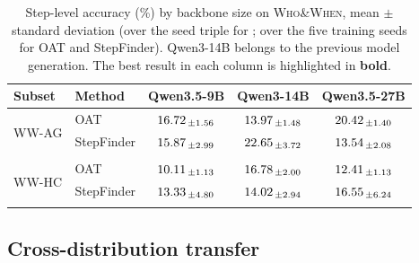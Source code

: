 \begin{table}[h]
\centering
\small
\setlength{\tabcolsep}{5pt}
\caption{Step-level accuracy (\%) by backbone size on \textsc{Who\&When}, mean $\pm$ standard
deviation (over the seed triple for \soap{}; over the five training seeds for OAT and
StepFinder). Qwen3-14B belongs to the previous model generation. The best result in
each column is highlighted in \textbf{bold}.}
\label{tab:scale}
\begin{tabular}{l l ccc}
\toprule
Subset & Method & Qwen3.5-9B & Qwen3-14B & Qwen3.5-27B \\
\midrule
\multirow{3}{*}{\textsc{WW-AG}}
 & OAT        & $16.72_{\,\pm 1.56}$ & $13.97_{\,\pm 1.48}$ & $20.42_{\,\pm 1.40}$ \\
 & StepFinder & $15.87_{\,\pm 2.99}$ & $22.65_{\,\pm 3.72}$ & $13.54_{\,\pm 2.08}$ \\
 & \cellcolor{gray!10}\soap{}    & \cellcolor{gray!10}{\boldmath$\ms{47.62}{2.59}$} & \cellcolor{gray!10}{\boldmath$\ms{42.86}{4.67}$} & \cellcolor{gray!10}{\boldmath$\ms{44.97}{2.70}$} \\
\midrule
\multirow{3}{*}{\textsc{WW-HC}}
 & OAT        & $10.11_{\,\pm 1.13}$ & $16.78_{\,\pm 2.00}$ & $12.41_{\,\pm 1.13}$ \\
 & StepFinder & $13.33_{\,\pm 4.80}$ & $14.02_{\,\pm 2.94}$ & $16.55_{\,\pm 6.24}$ \\
 & \cellcolor{gray!10}\soap{}    & \cellcolor{gray!10}{\boldmath$\ms{34.48}{2.82}$} & \cellcolor{gray!10}{\boldmath$\ms{25.29}{6.50}$} & \cellcolor{gray!10}{\boldmath$\ms{34.48}{2.82}$} \\
\bottomrule
\end{tabular}
\end{table}

\subsection{Cross-distribution transfer}
\label{app:transfer}

